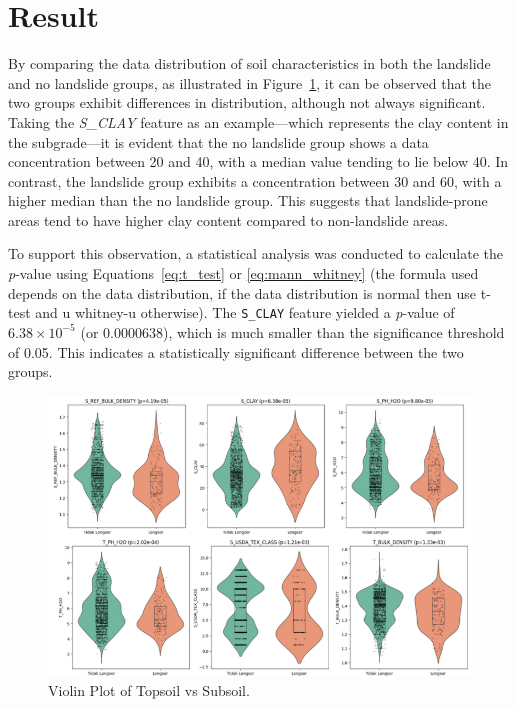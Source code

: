 \section{Result}
By comparing the data distribution of soil characteristics in both the landslide and no landslide groups, as illustrated in Figure~\ref{fig:Violin-plot}, it can be observed that the two groups exhibit differences in distribution, although not always significant. Taking the \textit{S\_CLAY} feature as an example—which represents the clay content in the subgrade—it is evident that the no landslide group shows a data concentration between 20 and 40, with a median value tending to lie below 40. In contrast, the landslide group exhibits a concentration between 30 and 60, with a higher median than the no landslide group. This suggests that landslide-prone areas tend to have higher clay content compared to non-landslide areas.

To support this observation, a statistical analysis was conducted to calculate the \textit{p}-value using Equations~\ref{eq:t_test} or \ref{eq:mann_whitney} (the formula used depends on the data distribution, if the data distribution is normal then use t-test and u whitney-u otherwise). The \texttt{S\_CLAY} feature yielded a \textit{p}-value of $6.38 \times 10^{-5}$ (or 0.0000638), which is much smaller than the significance threshold of 0.05. This indicates a statistically significant difference between the two groups.

\begin{figure}[htbp]
    \centerline{\includegraphics[width=\linewidth]{fig6.png}}
    \caption{Violin Plot of Topsoil vs Subsoil.}
    \label{fig:Violin-plot}
\end{figure}

